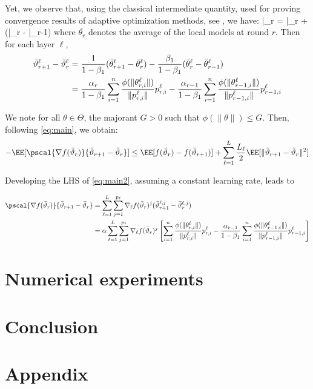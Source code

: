 \documentclass{article}
\begin{document}
Yet, we observe that, using the classical intermediate quantity, used for proving convergence results of adaptive optimization methods, see \citep{}, we have:
\beq
\bar{\vartheta}_r = \bar{\theta}_r +  (\bar{\theta}_{r} - \bar{\theta}_{r-1})
\eeq
where $\bar{\theta_r}$ denotes the average of the local models at round $r$.
Then for each layer $\ell$,
\begin{align}\notag
\bar{\vartheta}^\ell_{r+1} - \bar{\vartheta}^\ell_r  & = \frac{1}{1-\beta_1}(\bar{\theta}^\ell_{r+1} - \bar{\theta}^\ell_{r}) - \frac{\beta_1}{1-\beta_1}(\bar{\theta}^\ell_{r} - \bar{\theta}^\ell_{r-1})\\
& = \frac{\alpha_{r}}{1-\beta_1} \sum_{i = 1}^n \frac{\phi(\|\theta_{r,i}^{\ell}\|)}{\|p_{r,i}^{\ell}\|} p_{r,i}^{\ell}  - \frac{\alpha_{r-1}}{1-\beta_1}\sum_{i = 1}^n \frac{\phi(\|\theta_{r-1,i}^{\ell}\|)}{\|p_{r-1,i}^{\ell}\|} p_{r-1,i}^{\ell}
\end{align}

We note for all $\theta \in \Theta$, the majorant $G > 0$ such that $\phi(\|\theta \|) \leq G$. Then, following \eqref{eq:main}, we obtain:
\begin{align}\label{eq:main2}
- \EE[  \pscal{\nabla f(\bar{\vartheta}_r)}{\bar{\vartheta}_{r+1} - \bar{\vartheta}_r}]  \leq  \EE[ f(\bar{\vartheta}_r) - f(\bar{\vartheta}_{r+1})] + \sum_{\ell =1}^L \frac{L_\ell}{2} \EE[  \| \bar{\vartheta}_{r+1} - \bar{\vartheta}_r \|^2]
\end{align}

Developing the LHS of \eqref{eq:main2}, assuming a constant learning rate, leads to

\begin{align}
\pscal{\nabla f(\bar{\vartheta}_r)}{\bar{\vartheta}_{r+1} - \bar{\vartheta}_r} &= \sum_{\ell=1}^L \sum_{j=1}^{p_\ell} \nabla_{\ell} f(\bar{\vartheta}_r)^j (\bar{\vartheta}^{\ell,j}_{r+1} - \bar{\vartheta}^{\ell,j}_r) \\
& = \alpha \sum_{\ell=1}^L \sum_{j=1}^{p_\ell} \nabla_{\ell} f(\bar{\vartheta}_r)^j \left[  \sum_{i = 1}^n \frac{\phi(\|\theta_{r,i}^{\ell}\|)}{\|p_{r,i}^{\ell}\|} p_{r,i}^{\ell}  - \frac{\alpha_{r-1}}{1-\beta_1}\sum_{i = 1}^n \frac{\phi(\|\theta_{r-1,i}^{\ell}\|)}{\|p_{r-1,i}^{\ell}\|} p_{r-1,i}^{\ell} \right]
\end{align}


\section{Numerical experiments}\label{sec:numerical}


\section{Conclusion}\label{sec:conclusion}

\newpage





\appendix

\section{Appendix}\label{sec:appendix}


\end{document}
